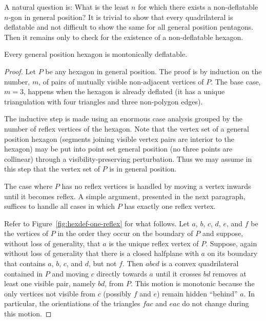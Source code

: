 \documentclass[11pt]{amsart}
\begin{document}
A natural question is: What is the least $n$ for which there exists a
non-deflatable $n$-gon in general position?  It is trivial to show
that every quadrilateral is deflatable and not difficult to show the
same for all general position pentagons.  Then it remains only to
check for the existence of a non-deflatable hexagon.

\begin{theorem}\label{thm:hex-deflate}
  Every general position hexagon is montonically deflatable.
\end{theorem}

\begin{proof}
  Let $P$ be any hexagon in general position.  The proof is by
  induction on the number, $m$, of pairs of mutually visible
  non-adjacent vertices of $P$.  The base case, $m=3$, happens when
  the hexagon is already deflated (it has a unique triangulation with
  four triangles and three non-polygon edges).

  The inductive step is made using an enormous case analysis grouped
  by the number of reflex vertices of the hexagon.  Note that the
  vertex set of a general position hexagon (segments joining visible
  vertex pairs are interior to the hexagon) may be put into point set
  general position (no three points are collinear) through a
  visibility-preserving perturbation.  Thus we may assume in this step
  that the vertex set of $P$ is in general position.

  The case where $P$ has no reflex vertices is handled by moving a
  vertex inwards until it becomes reflex.  A simple argument,
  presented in the next paragraph, suffices to handle all cases in
  which $P$ has exactly one reflex vertex.

  Refer to Figure~\ref{fig:hexdef-one-reflex} for what follows.  Let
  $a$, $b$, $c$, $d$, $e$, and $f$ be the vertices of $P$ in the order
  they occur on the boundary of $P$ and suppose, without loss of
  generality, that $a$ is the unique reflex vertex of $P$.  Suppose,
  again without loss of generality that there is a closed halfplane
  with $a$ on its boundary that contains $a$, $b$, $c$, and $d$, but
  not $f$. Then $abcd$ is a convex quadrilateral contained in $P$ and
  moving $c$ directly towards $a$ until it crosses $bd$ removes at
  least one visible pair, namely $bd$, from $P$.  This motion is
  monotonic because the only vertices not visible from $c$ (possibly
  $f$ and $e$) remain hidden ``behind'' $a$.  In particular, the
  orientiations of the triangles $fac$ and $eac$ do not change during
  this motion.


\end{proof}
\end{document}
